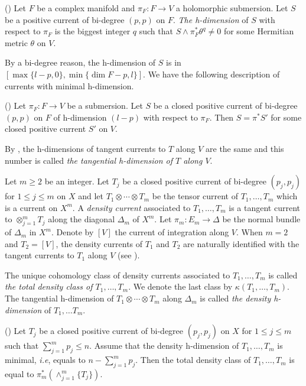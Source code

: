     \begin{definition} (\cite[Definition 3.1]{Dinh_Sibony_density}) 
        Let $F$ be a complex manifold and $\pi_F: F \to V$ a holomorphic submersion. Let $S$ be  a positive current of bi-degree $(p,p)$  on $F$. \emph{The h-dimension} of $S$ with respect to $\pi_F$ is the biggest integer $q$ such that $S \wedge \pi_F^* \theta^q \not =0$ for some Hermitian metric $\theta$ on $V$.  
    \end{definition}

    By a bi-degree reason, the h-dimension of $S$ is in $[\max\{l- p,0\}, \min\{\dim F -p,l\}]$.     We have the following description of currents with minimal h-dimension. 

    \begin{lemma} \label{le-minimalhdimension} (\cite[Lemma 3.4]{Dinh_Sibony_density})
        Let $\pi_F: F \to V$ be a submersion. Let $S$ be a closed positive current of bi-degree $(p,p)$ on $F$ of h-dimension $(l -p)$ with respect to $\pi_F$. Then $S= \pi^* S'$ for some closed positive current $S'$ on $V$. 
    \end{lemma} 

    By \cite[Lemma 3.8]{Dinh_Sibony_density}, the h-dimensions of tangent currents to $T$ along $V$ are the same and this number is called \emph{the tangential h-dimension of $T$ along $V$}. 


    Let $m\ge 2$ be an integer. Let $T_j$ be a closed positive current  of bi-degree $(p_j, p_j)$ for $1 \le j \le m$ on $X$ and let  $T_1 \otimes \cdots \otimes T_m$ be the tensor current of $T_1, \ldots, T_m$ which is a current on $X^m.$  A \emph{density current} associated to $T_1, \ldots,  T_m$ is a tangent current to $\otimes_{j=1}^m T_j$ along the diagonal $\Delta_m$ of $X^m.$ Let $\pi_m: E_m \to \Delta$ be the normal bundle of $\Delta_m$ in $X^m$. Denote by $[V]$ the current of integration along $V$.  When $m=2$ and $T_2 =[V]$, the density currents of $T_1$ and  $T_2$ are naturally identified with the  tangent currents to $T_1$ along $V$ (see \cite[Lemma 2.3]{Vu_density-nonkahler}). 


    The unique cohomology class of density currents associated to $T_1,\ldots,T_m$ is called \emph{the total density class of $T_1, \ldots, T_m$}. We denote the last class by $\kappa(T_1,\ldots, T_m)$. The tangential h-dimension of  $T_1 \otimes \cdots \otimes T_m$ along $\Delta_m$ is called \emph{the density h-dimension} of  $T_1, \ldots T_m$. 

    \begin{lemma} \label{le-classDSproduct} (\cite[Section 5]{Dinh_Sibony_density})  
        Let $T_j$ be a closed positive current of bi-degree $(p_j,p_j)$ on $X$ for $1 \le j \le m$ such that $\sum_{j=1}^m p_j \le n$. Assume that the density h-dimension of $T_1, \ldots, T_m$ is minimal, \emph{i.e}, equals to $n- \sum_{j=1}^m p_j$. Then the total density class of  $T_1, \ldots, T_m$ is equal to $\pi_{m}^*(\wedge_{j=1}^m\{T_j\})$. 
    \end{lemma}




